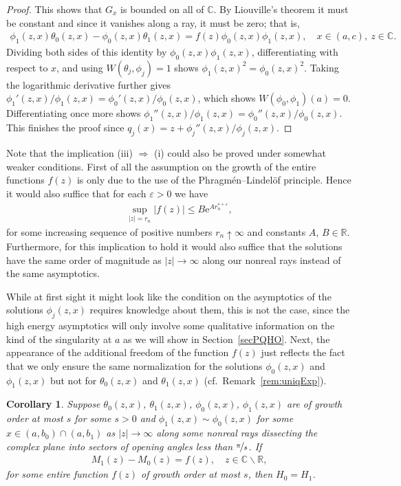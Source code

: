 \documentclass{amsart}
\newtheorem{corollary}[theorem]{Corollary}
\numberwithin{equation}{section}
\begin{document}
\begin{proof}
This shows that $G_x$ is bounded on all of ${{\mathbb C}}$.
By Liouville's theorem it must be constant and since it vanishes along a ray, it must be zero; that is,
\begin{align*}
\phi_1(z,x) \theta_0(z,x) - \phi_0(z,x) \theta_1(z,x) = f(z)\phi_0(z,x)\phi_1(z,x), \quad x\in(a,c),~z\in{{\mathbb C}}.
\end{align*}
Dividing both sides of this identity by $\phi_0(z,x)\phi_1(z,x)$, differentiating with respect to $x$, and using $W(\theta_j,\phi_j)=1$ shows
$\phi_1(z,x)^2 = \phi_0(z,x)^2$. Taking the logarithmic derivative further gives
$\phi_1'(z,x)/\phi_1(z,x)=\phi_0'(z,x)/\phi_0(z,x)$, which shows $W(\phi_0,\phi_1)(a)=0$. Differentiating once more shows
$\phi_1''(z,x)/\phi_1(z,x)=\phi_0''(z,x)/\phi_0(z,x)$. This finishes the proof since $q_j(x)=z + \phi_j''(z,x)/\phi_j(z,x)$.
\end{proof}

Note that the implication (iii) $\Rightarrow$ (i) could also be proved under somewhat weaker conditions.
First of all the assumption on the growth of the entire functions $f(z)$ is only due to the use of the Phragm\'{e}n--Lindel\"{o}f principle.
Hence it would also suffice that for each ${\varepsilon}>0$ we have
\begin{align}\label{eqnbmaltgrowth}
\sup_{|z|=r_n} |f(z)| \leq B {\mathrm{e}}^{A r_n^{s+{\varepsilon}}},
\end{align}
for some increasing sequence of positive numbers $r_n\uparrow\infty$ and constants $A$, $B\in{{\mathbb R}}$.
Furthermore, for this implication to hold it would also suffice that the solutions have the same order of magnitude as $|z|\rightarrow\infty$ along our nonreal rays instead of the same asymptotics.

While at first sight it might look like the condition on the asymptotics of the solutions $\phi_j(z,x)$ requires knowledge
about them, this is not the case, since the high energy asymptotics will only involve some qualitative information
on the kind of the singularity at $a$ as we will show in Section~\ref{secPQHO}.
Next, the appearance of the additional freedom of the function $f(z)$ just reflects the fact that we only ensure the same normalization
for the solutions $\phi_0(z,x)$ and $\phi_1(z,x)$ but not for $\theta_0(z,x)$ and $\theta_1(z,x)$ (cf.\ Remark~\ref{rem:uniqExp}).

\begin{corollary}\label{corbm}
Suppose $\theta_0(z,x)$, $\theta_1(z,x)$, $\phi_0(z,x)$, $\phi_1(z,x)$ are of growth order at most $s$ for some $s>0$ and  $\phi_1(z,x) \sim \phi_0(z,x)$ for some $x\in(a,b_0)\cap(a,b_1)$ as $|z|\to\infty$ along some nonreal rays dissecting the complex plane into sectors of opening angles less than $\nicefrac{\pi}{s}$.
If 
\begin{align}\label{eqncorbm}
 M_1(z) - M_0(z) = f(z), \quad z\in{{\mathbb C}}\backslash{{\mathbb R}},
\end{align}
for some entire function $f(z)$ of growth order at most $s$, then $H_0=H_1$.
\end{corollary}
\end{document}
